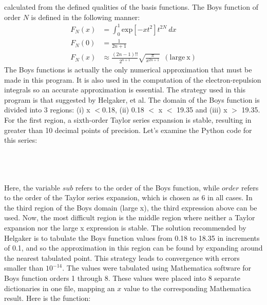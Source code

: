 \documentclass[12pt]{article}
\begin{document}
calculated from the defined qualities of the basis functions. The Boys
function of order $N$ is defined in the following manner:
\begin{align*}
F_N(x) &= \int^1_0 \mathrm{exp} [-xt^2] t^{2N}\ dx \\
F_N(0) &= \frac{1}{2n+1} \\
F_N(x) &\approx \frac{(2n-1)!!}{2^{n+1}}\sqrt{\frac{\pi}{x^{2n+1}}} \ \ \mathrm{  (large \ x)}
\end{align*}
The Boys functions is actually the only numerical approximation that must be made
in this  program. It is also used in the computation of the electron-repulsion
integrals so an accurate approximation is essential. The strategy used in this
program is that suggested by Helgaker, et al. The domain of the Boys function
is divided into 3 regions:  (i) x $<$0.18, (ii) 0.18 $<$ x $<$ 19.35 and (iii) x $>$ 19.35.
For the first region, a sixth-order Taylor series expansion is stable, resulting in greater than 10
decimal points of precision. Let's examine the Python code for this series: \\
\\
\hspace{0.15in}{\tt def TAYLOR(x,order,sub): }

\hspace{0.5in}{\tt total=0.0}

\hspace{0.5in}{\tt for k in range(order+1):}

\hspace{0.85in}{\tt total+=((-1*x)**k)/factorial(k)/(2*sub+2*k+1)}

\hspace{0.5in}{\tt return total} \\
\\
Here, the variable $sub$ refers to the order of the Boys function, while
$order$ refers to the order of the Taylor series expansion, which is chosen
as 6 in all cases. In the third region of the Boys domain (large x), the
third expression above can be used. Now, the most difficult region is
the middle region where neither a Taylor expansion nor the large x
expression is stable. The solution recommended by Helgaker is to 
tabulate the Boys function values from 0.18 to 18.35 in increments of 0.1,
and so the approximation in this region can be found by expanding around
the nearest tabulated point. This strategy leads to convergence with errors
smaller than $10^{-14}$. The values were tabulated using Mathematica software
for Boys function orders 1 through 8. These values were placed into
8 separate dictionaries in one file, mapping an $x$ value to the corresponding
Mathematica result. Here is the function:
\\
\end{document}
